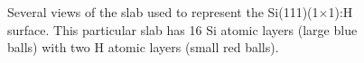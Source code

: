 \begin{figure}[t]
\centering
{}\hfill
{}\hfill
{}
\caption{Several views of the slab used to represent the Si(111)(1$\times$1):H
surface. This particular slab has 16 Si atomic layers (large blue balls) with
two H atomic layers (small red balls).}
\label{fig:1x1struc}
\end{figure}

